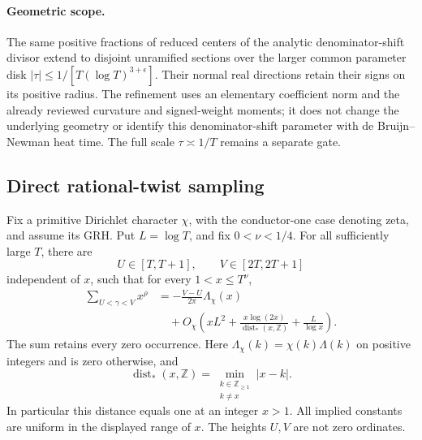 \paragraph{Geometric scope.}
The same positive fractions of reduced centers of the analytic
denominator-shift divisor extend to disjoint unramified sections
over the larger common parameter disk
\(|\tau|\le1/[T(\log T)^{3+\epsilon}]\).
Their normal real directions retain their signs on its positive
radius. The refinement uses an elementary coefficient norm and
the already reviewed curvature and signed-weight moments; it
does not change the underlying geometry or identify this
denominator-shift parameter with de Bruijn--Newman heat time.
The full scale \(\tau\asymp1/T\) remains a separate gate.


\subsection*{Direct rational-twist sampling}

\begin{lemma}
\label{lem:A049-rational-landau}
Fix a primitive Dirichlet character \(\chi\), with the conductor-one
case denoting zeta, and assume its GRH. Put \(L=\log T\), and fix
\(0<\nu<1/4\). For all sufficiently large \(T\), there are
\[
 U\in[T,T+1],\qquad V\in[2T,2T+1]
\]
independent of \(x\), such that for every \(1<x\le T^\nu\),
\begin{equation}\label{eq:A049-rational-landau}
 \begin{aligned}
 \sum_{U<\gamma<V}x^\rho
   &=-\frac{V-U}{2\pi}\Lambda_\chi(x)\\
   &\quad+O_\chi\!\left(
      xL^2+\frac{x\log(2x)}{\operatorname{dist}_*(x,\mathbb Z)}
                         +\frac{L}{\log x}\right).
 \end{aligned}
\end{equation}
The sum retains every zero occurrence. Here
\(\Lambda_\chi(k)=\chi(k)\Lambda(k)\) on positive integers and
is zero otherwise, and
\[
 \operatorname{dist}_*(x,\mathbb Z)
     =\min_{\substack{k\in\mathbb Z_{\ge1}\\ k\ne x}}|x-k|.
\]
In particular this distance equals one at an integer \(x>1\).
All implied constants are uniform in the displayed range of \(x\).
The heights \(U,V\) are not zero ordinates.
\end{lemma}

